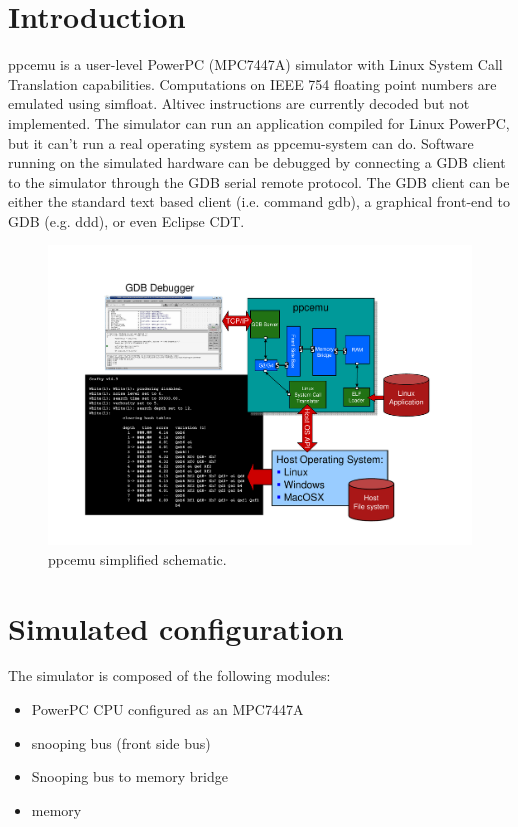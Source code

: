 \section{Introduction}

ppcemu is a user-level PowerPC (MPC7447A) simulator with Linux System Call Translation capabilities. Computations on IEEE 754 floating point numbers are emulated using simfloat. Altivec instructions are currently decoded but not implemented. The simulator can run an application compiled for Linux PowerPC, but it can’t run a real operating system as ppcemu-system can do. Software running on the simulated hardware can be debugged by connecting a GDB client to the simulator through the GDB serial remote protocol. The GDB client can be either the standard text based client (i.e. command gdb), a graphical front-end to GDB (e.g. ddd), or even Eclipse CDT.

\begin{figure}[!h]
	\begin{center}
		\includegraphics[width=\textwidth]{ppcemu/fig_ppcemu.pdf}
	\end{center}
	\caption{ppcemu simplified schematic.}
	\label{fig:ppcemu_system}
\end{figure}

\section{Simulated configuration}

The simulator is composed of the following modules:
\begin{itemize}\addtolength{\itemsep}{-0.40\baselineskip}
\item PowerPC CPU configured as an MPC7447A
\item snooping bus (front side bus)
\item Snooping bus to memory bridge
\item memory
\end{itemize}

